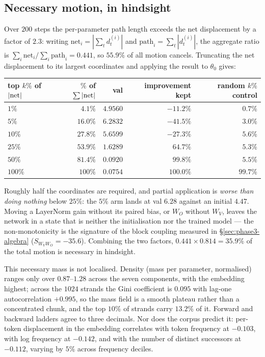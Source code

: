 \subsection{Necessary motion, in hindsight}

Over $200$ steps the per-parameter path length exceeds the net displacement by
a factor of $2.3$: writing $\mathrm{net}_i = |\sum_t d_t^{(i)}|$ and
$\mathrm{path}_i = \sum_t |d_t^{(i)}|$, the aggregate ratio is
$\sum_i \mathrm{net}_i / \sum_i \mathrm{path}_i = 0.441$, so $55.9\%$ of all
motion cancels. Truncating the net displacement to its largest coordinates and
applying the result to $\theta_0$ gives:

\begin{center}
\begin{tabular}{lrrrr}
\toprule
top $k\%$ of $|{\rm net}|$ & $\%$ of $\sum|{\rm net}|$ & val & improvement kept & random $k\%$ control \\
\midrule
$1\%$   & $4.1\%$  & $4.9560$ & $-11.2\%$ & $0.7\%$ \\
$5\%$   & $16.0\%$ & $6.2832$ & $-41.5\%$ & $3.0\%$ \\
$10\%$  & $27.8\%$ & $5.6599$ & $-27.3\%$ & $5.6\%$ \\
$25\%$  & $53.9\%$ & $1.6289$ & $64.7\%$  & $5.3\%$ \\
$50\%$  & $81.4\%$ & $0.0920$ & $99.8\%$  & $5.5\%$ \\
$100\%$ & $100\%$  & $0.0754$ & $100.0\%$ & $99.7\%$ \\
\bottomrule
\end{tabular}
\end{center}

Roughly half the coordinates are required, and partial application is
\emph{worse than doing nothing} below $25\%$: the $5\%$ arm lands at val
$6.28$ against an initial $4.47$. Moving a LayerNorm gain without its paired
bias, or $W_O$ without $W_V$, leaves the network in a state that is neither the
initialisation nor the trained model --- the non-monotonicity is the signature
of the block coupling measured in \S\ref{sec:phase3-algebra} ($S_{W_V W_O} =
-35.6$). Combining the two factors, $0.441 \times 0.814 = 35.9\%$ of the total
motion is necessary in hindsight.

This necessary mass is not localised. Density (mass per parameter, normalised)
ranges only over $0.87$--$1.28$ across the seven components, with the embedding
highest; across the $1024$ strands the Gini coefficient is $0.095$ with lag-one
autocorrelation $+0.995$, so the mass field is a smooth plateau rather than a
concentrated chunk, and the top $10\%$ of strands carry $13.2\%$ of it. Forward
and backward ladders agree to three decimals. Nor does the corpus predict it:
per-token displacement in the embedding correlates with token frequency at
$-0.103$, with log frequency at $-0.142$, and with the number of distinct
successors at $-0.112$, varying by $5\%$ across frequency deciles.

